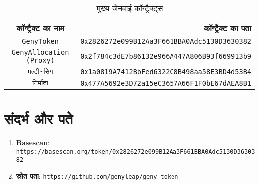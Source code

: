 \documentclass[a4paper,12pt,openany]{book}
\begin{document}
\begin{table}[h]
\centering
\caption*{मुख्य जेनवाई कॉन्ट्रैक्ट्स}
\small
\begin{tabular}{c r}
\hline
\textbf{कॉन्ट्रैक्ट का नाम} & \textbf{कॉन्ट्रैक्ट का पता} \\
\hline
\texttt{GenyToken} & {\texttt{0x2826272e099B12Aa3F661BBA0Adc5130D3630382}} \\
\texttt{GenyAllocation (Proxy)} & {\texttt{0x2f784c3dE7b86132e966A447A806B93f669913b9}} \\
\texttt{मल्टी-सिग} & {\texttt{0x1a0819A7412BbFed6322C8B498aa58E3BD4d53B4}} \\
\texttt{निर्माता} & {\texttt{0x477A5692e3D72a15eC3657A66F1F0bE67dAEA8B1}} \\
\hline
\end{tabular}
\end{table}

\section*{संदर्भ और पते}

\begin{enumerate}
    \item \textbf{Basescan}: \texttt{https://basescan.org/token/0x2826272e099B12Aa3F661BBA0Adc5130D3630382}
    \item \textbf{स्रोत पता}: \texttt{https://github.com/genyleap/geny-token}
\end{enumerate}
\end{document}
